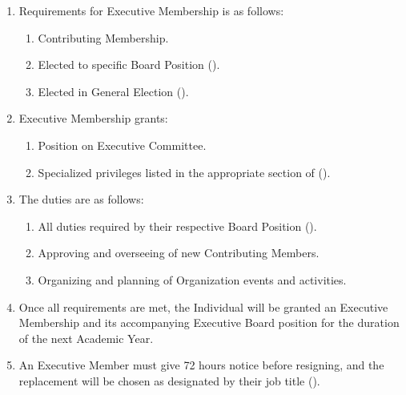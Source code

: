 \begin{enumerate}
	\item Requirements for Executive Membership is as follows:
		\begin{enumerate}
			\item Contributing Membership.

			\item Elected to specific Board Position ().

			\item Elected in General Election ().
		\end{enumerate}

	\item Executive Membership grants:
		\begin{enumerate}
			\item Position on Executive Committee.

			\item Specialized privileges listed in the appropriate section of ().
		\end{enumerate}

	\item The duties are as follows:
		\begin{enumerate}
			\item All duties required by their respective Board Position ().

			\item Approving and overseeing of new Contributing Members.

			\item Organizing and planning of Organization events and activities.
		\end{enumerate}

	\item Once all requirements are met, the Individual will be granted an
		Executive Membership and its accompanying Executive Board position for the
		duration of the next Academic Year.

	\item An Executive Member must give 72 hours notice before resigning, and the
		replacement will be chosen as designated by their job title ().
\end{enumerate}

